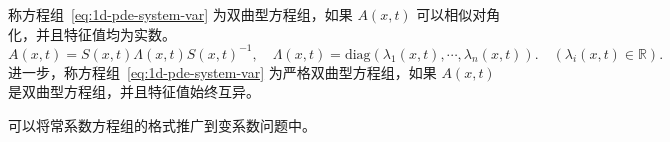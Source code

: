 \begin{definition}
    称方程组~\eqref{eq:1d-pde-system-var} 为双曲型方程组，如果 $A(x,t)$ 可以相似对角化，并且特征值均为实数。
    \[
        A(x,t) = S(x,t) \Lambda(x,t) S(x,t)^{-1},\quad
        \Lambda(x,t) = \text{diag}(\lambda_1(x,t),\cdots,\lambda_n(x,t)).\quad (\lambda_i(x,t) \in \mathbb{R}).
    \]
    进一步，称方程组~\eqref{eq:1d-pde-system-var} 为严格双曲型方程组，如果 $A(x,t)$ 是双曲型方程组，并且特征值始终互异。
\end{definition}

可以将常系数方程组的格式推广到变系数问题中。
